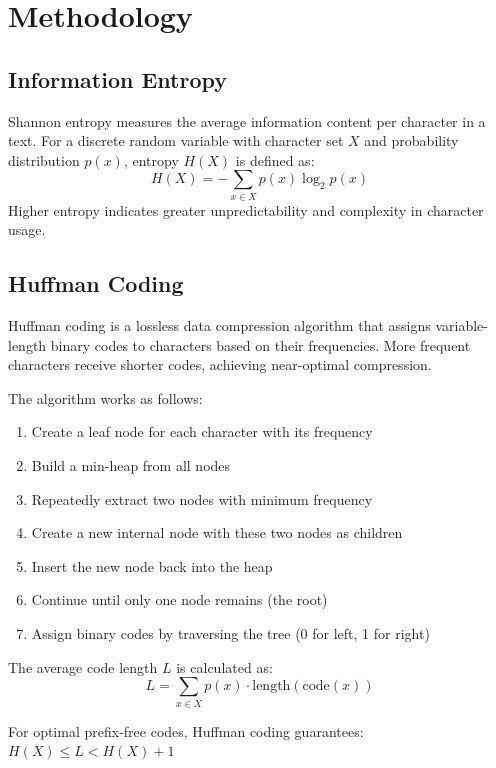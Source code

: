 \documentclass[11pt]{article}
\begin{document}
\section{Methodology}

\subsection{Information Entropy}
Shannon entropy measures the average information content per character in a text. For a discrete random variable with character set $X$ and probability distribution $p(x)$, entropy $H(X)$ is defined as:
\begin{equation}
    H(X) = -\sum_{x \in X} p(x) \log_2 p(x)
\end{equation}
Higher entropy indicates greater unpredictability and complexity in character usage.

\subsection{Huffman Coding}
Huffman coding is a lossless data compression algorithm that assigns variable-length binary codes to characters based on their frequencies. More frequent characters receive shorter codes, achieving near-optimal compression.

The algorithm works as follows:
\begin{enumerate}
    \item Create a leaf node for each character with its frequency
    \item Build a min-heap from all nodes
    \item Repeatedly extract two nodes with minimum frequency
    \item Create a new internal node with these two nodes as children
    \item Insert the new node back into the heap
    \item Continue until only one node remains (the root)
    \item Assign binary codes by traversing the tree (0 for left, 1 for right)
\end{enumerate}

The average code length $L$ is calculated as:
\begin{equation}
    L = \sum_{x \in X} p(x) \cdot \text{length}(\text{code}(x))
\end{equation}

For optimal prefix-free codes, Huffman coding guarantees: $H(X) \leq L < H(X) + 1$
\end{document}
